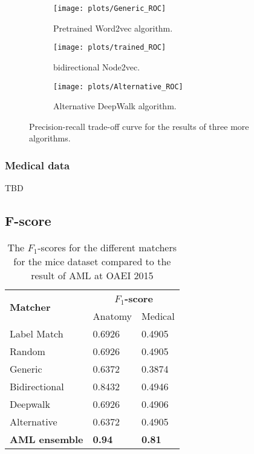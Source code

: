 \documentclass{article}
\begin{document}
 
  \begin{figure}[H]
   \centering
  
 \begin{subfigure}{.3\textwidth}
   \centering
   \texttt{[image: plots/Generic\_ROC]}
   \caption[Precision-recall curve pre-trained mice]{Pretrained Word2vec algorithm.}
   \label{ROC_generic}
   \end{subfigure}
 \begin{subfigure}{.3\textwidth}
   \centering
   \texttt{[image: plots/trained\_ROC]}
   \caption[Precision-recall curve trained mice model]{bidirectional Node2vec.}
   \label{ROC_trained}
  \end{subfigure}
 \begin{subfigure}{.3\textwidth}
   \centering
   \texttt{[image: plots/Alternative\_ROC]}
   \caption[Precision-recall curve DeepWalk mice]{Alternative DeepWalk algorithm.}
   \label{ROC_alternative}
  \end{subfigure}
  \caption{Precision-recall trade-off curve for the results of three more algorithms.}
  \end{figure}
   \subsubsection{Medical data}
   TBD
  
  \subsection{F-score}
  \begin{table}[H]
  \caption[$F_1$ mice]{The $F_1$-scores for the different matchers for the mice dataset compared to the result of AML at OAEI 2015 \cite{oaei2015}}
  \label{fscores}
  \begin{tabular}{l|ll}
  \multirow{2}{*}{\textbf{Matcher}} & \multicolumn{2}{c}{\textbf{$F_1$-score}} \\
  & Anatomy & Medical\\
  \hline
  Label Match & 0.6926 & 0.4905 \\
  Random & 0.6926 & 0.4905 \\
  Generic & 0.6372 & 0.3874 \\
  Bidirectional & 0.8432 & 0.4946 \\
  Deepwalk & 0.6926 & 0.4906 \\
  Alternative & 0.6372 & 0.4905 \\
  \textbf{AML ensemble} & \textbf{0.94} & \textbf{0.81} \\ %
  \end{tabular}
  \end{table}
\end{document}
